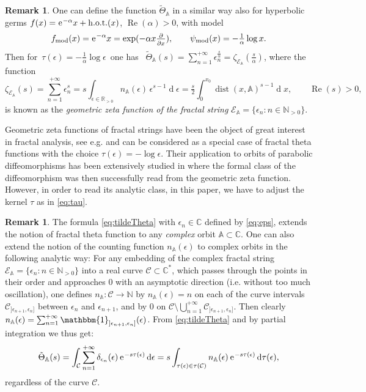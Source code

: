 \documentclass[a4paper,11pt]{amsart}
\numberwithin{equation}{section}
\newcommand{\C}{{\mathbb C}}
\newcommand{\N}{{\mathbb N}}
\newcommand{\R}{{\mathbb R}}
\newcommand{\Cal}{\mathcal}
\newcommand{\sminus}{\setminus} %
\newcommand{\hot}{\mathrm{h.o.t.}}
\newcommand{\re}{\operatorname{Re}}
\renewcommand{\d}{\ensuremath{\operatorname{d}\!}}
\newcommand{\e}{\ensuremath{\mkern.25\thinmuskip\mathrm{e}\mkern.4\thinmuskip}}
\newcommand{\tdd}[1]{\tfrac{\partial}{\partial #1 \vphantom{\hat X}}}
\newcommand{\model}{{\mathrm{mod}}}
\newcommand{\psimod}{\psi_\model}
\newcommand{\orbit}{\mathbb{A}}
\newcommand{\dist}{\operatorname{dist}}
\theoremstyle{definition}
\newtheorem{remark}[theorem]{Remark}
\begin{document}
\begin{remark}
One can define the function $\tilde\Theta_\orbit$ in a similar way also for hyperbolic germs $f(x)=\e^{-\alpha}x+\hot(x)$, $\re(\alpha)>0$, with model
\[f_\model(x)=\e^{-\alpha}x=\exp(-\alpha x\tdd{x}),\qquad \psimod(x)=-\tfrac1\alpha\log x.\] 
Then for $\,\tau(\epsilon)=-\tfrac1\alpha\log\epsilon\,$ one has \
$\tilde\Theta_\orbit(s)=\sum_{n=1}^{+\infty}\epsilon_n^{\frac{s}{\alpha}}
=\zeta_{\Cal E_\orbit}(\tfrac{s}{\alpha})$, 
where the function 
\[\zeta_{\Cal E_\orbit}(s)=\sum_{n=1}^{+\infty}\epsilon_n^{s}
=s\!\int_{\epsilon\in\R_{>0}}\!\!\!\!\! n_\orbit(\epsilon)\,\epsilon^{s-1}\!\d\epsilon
=\tfrac{s}{2}\!\int_0^{x_0}\!\! \dist(x,\orbit)^{s-1}\!\d x,\qquad \re(s)>0,\] 
is known as the \emph{geometric zeta function of the fractal string} $\Cal E_\orbit=\{\epsilon_n: n\in\N_{>0}\}$.
\end{remark}

Geometric zeta functions of fractal strings have been the object of great interest in fractal analysis, see e.g. \cite{LRZ,LapFr1,LapFr2} and can be considered as a special case of fractal theta functions 
with the choice $\tau(\epsilon)=-\log\epsilon$.
Their application to orbits of parabolic diffeomorphisms has been extensively studied in \cite{MRR} where the formal class of the diffeomorphism was then successfully read from the geometric zeta function.
However, in order to read its analytic class, in this paper, we have to adjust the kernel $\tau$ as in \eqref{eq:tau}. 


\begin{remark}\label{rem: complex tilda theta}
The formula \eqref{eq:tildeTheta}
with $\epsilon_n\in\mathbb C$ defined by \eqref{eq:eps}, extends the notion of fractal theta function to any  \emph{complex} orbit $\orbit\subset\C$.                                                                         
One can also extend the notion of the counting function $n_\orbit(\epsilon)$ to complex orbits in the following analytic way:
For any embedding of the complex fractal string $\Cal E_\orbit=\{\epsilon_n: n\in\N_{>0}\}$ into a real curve $\Cal C\subset\C^*$, which passes through the points in their order and approaches $0$ with an asymptotic direction (i.e. without too much oscillation), one defines
$n_\orbit:\Cal C\to\N$ by $n_\orbit(\epsilon)=n$ on each of the curve intervals $\Cal C_{]\epsilon_{n+1},\epsilon_n]}$ between $\epsilon_{n}$ and $\epsilon_{n+1}$, and by $0$ on $\Cal C\sminus\bigcup_{n=1}^{+\infty}\Cal C_{]\epsilon_{n+1},\epsilon_n]}$.
Then clearly $n_\orbit(\epsilon)=\sum_{n=1}^{+\infty}\mathbbm {1}_{]\epsilon_{n+1},\epsilon_n]}(\epsilon)$. 
From \eqref{eq:tildeTheta} and by partial integration we thus get:
\begin{equation}\label{eq:tildeThetacomplex}\tilde{\Theta}_\orbit(s)=\int_{\Cal C}\sum_{n=1}^{+\infty}\delta_{\epsilon_n}(\epsilon)\,\e^{-s\tau(\epsilon)}\d\epsilon=
s\int_{\tau(\epsilon)\in\tau(\Cal C)}n_\orbit(\epsilon)\,\e^{-s\tau(\epsilon)}\d\tau(\epsilon),\end{equation}
regardless of the curve $\Cal C$.
\end{remark}
\end{document}
